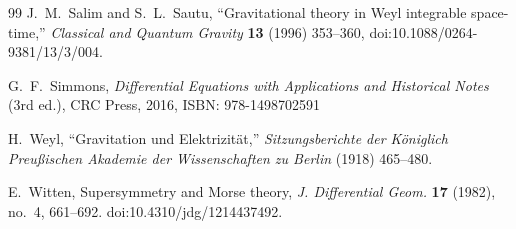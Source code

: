 \documentclass[preprint,12pt]{elsarticle}
\theoremstyle{plain}
\theoremstyle{definition}
\theoremstyle{note}
\begin{document}
\begin{thebibliography}{99}
J.~M.~Salim and S.~L.~Sautu,
\newblock ``Gravitational theory in Weyl integrable space-time,''
\newblock \emph{Classical and Quantum Gravity} \textbf{13} (1996) 353--360,
\newblock doi:10.1088/0264-9381/13/3/004.

G.~F.~Simmons,
\emph{Differential Equations with Applications and Historical Notes} (3rd ed.), CRC Press, 2016, ISBN: 978-1498702591

H.~Weyl,
\newblock ``Gravitation und Elektrizit{\"a}t,''
\newblock \emph{Sitzungsberichte der K{\"o}niglich Preu{\ss}ischen Akademie der Wissenschaften zu Berlin}
(1918) 465--480.

E.~Witten,
\newblock Supersymmetry and Morse theory,
\newblock \emph{J. Differential Geom.} \textbf{17} (1982), no.~4, 661--692.
\newblock doi:10.4310/jdg/1214437492.

\end{thebibliography}
\end{document}
